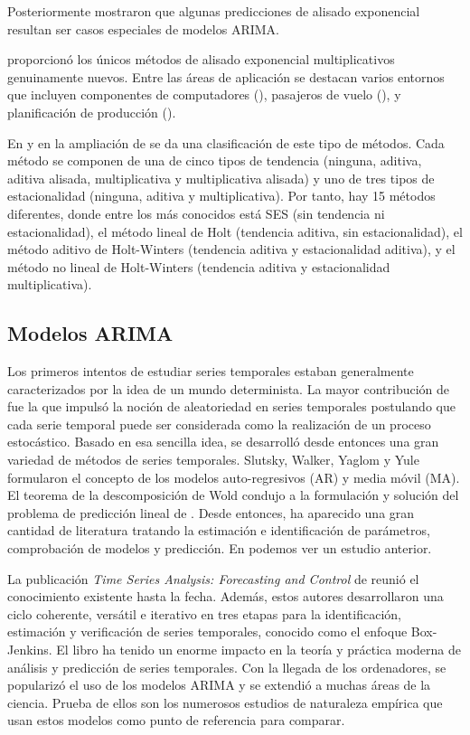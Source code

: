\documentclass{llncs}
\begin{document}
Posteriormente \cite{Box1976} mostraron que algunas predicciones de alisado exponencial resultan ser casos especiales de modelos ARIMA.

\cite{Taylor2003715} proporcionó los únicos métodos de alisado exponencial multiplicativos genuinamente nuevos. Entre las áreas de aplicación se destacan varios entornos que incluyen componentes de computadores (\cite{GardnerJr1993245}), pasajeros de vuelo (\cite{Grubb200171}), y planificación de producción (\cite{Miller1993509}).

En \cite{Hyndman2002439} y en la ampliación de \cite{Taylor2003715} se da una clasificación de este tipo de métodos. Cada método se componen de una de cinco tipos de tendencia (ninguna, aditiva, aditiva alisada, multiplicativa y multiplicativa alisada) y uno de tres tipos de estacionalidad (ninguna, aditiva y multiplicativa). Por tanto, hay 15 métodos diferentes, donde entre los más conocidos está SES (sin tendencia ni estacionalidad), el método lineal de Holt (tendencia aditiva, sin estacionalidad), el método aditivo de Holt-Winters (tendencia aditiva y estacionalidad aditiva), y el método no lineal de Holt-Winters (tendencia aditiva y estacionalidad multiplicativa).


\subsection{Modelos ARIMA}

Los primeros intentos de estudiar series temporales estaban generalmente caracterizados por la idea de un mundo determinista. La mayor contribución de \cite{Yule1927267} fue la que impulsó la noción de aleatoriedad en series temporales postulando que cada serie temporal puede ser considerada como la realización de un proceso estocástico. Basado en esa sencilla idea, se desarrolló desde entonces una gran variedad de métodos de series temporales. Slutsky, Walker, Yaglom y Yule formularon el concepto de los modelos auto-regresivos (AR) y media móvil (MA). El teorema de la descomposición de Wold condujo a la formulación y solución del problema de predicción lineal de \cite{Kolmogorov19411}. Desde entonces, ha aparecido una gran cantidad de literatura tratando la estimación e identificación de parámetros, comprobación de modelos y predicción. En \cite{Newbold198323} podemos ver un estudio anterior.

La publicación \emph{Time Series Analysis: Forecasting and Control} de \cite{Box1976} reunió el conocimiento existente hasta la fecha. Además, estos autores desarrollaron una ciclo coherente, versátil e iterativo en tres etapas para la identificación, estimación y verificación de series temporales, conocido como el enfoque Box-Jenkins. El libro ha tenido un enorme impacto en la teoría y práctica moderna de análisis y predicción de series temporales. Con la llegada de los ordenadores, se popularizó el uso de los modelos ARIMA y se extendió a muchas áreas de la ciencia. Prueba de ellos son los numerosos estudios de naturaleza empírica que usan estos modelos como punto de referencia para comparar.
\end{document}
